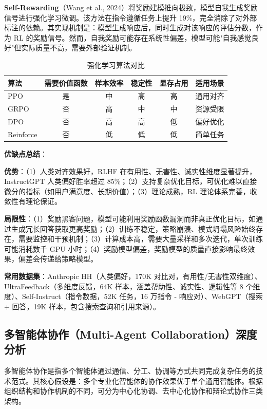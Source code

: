 \documentclass[12pt,a4paper]{article}
\begin{document}
\textbf{Self-Rewarding}（Wang et al., 2024）将奖励建模推向极致，模型自我生成奖励信号进行强化学习微调。该方法在指令遵循任务上提升 19\%，完全消除了对外部标注的依赖。其实现机制是：模型生成响应后，同时生成对该响应的评估分数，作为 RL 的奖励信号。然而，自我奖励可能存在系统性偏差，模型可能"自我感觉良好"但实际质量不高，需要外部验证机制。

\begin{table}[h]
\centering
\caption{强化学习算法对比}
\label{tab:rl-compare}
\begin{tabular}{@{}lccccc@{}}
\toprule
\textbf{算法} & \textbf{需要价值函数} & \textbf{样本效率} & \textbf{稳定性} & \textbf{显存占用} & \textbf{适用场景} \\
\midrule
PPO & 是 & 中 & 高 & 高 & 通用对齐 \\
GRPO & 否 & 高 & 中 & 中 & 资源受限 \\
DPO & 否 & 高 & 高 & 低 & 偏好优化 \\
Reinforce & 否 & 低 & 低 & 低 & 简单任务 \\
\bottomrule
\end{tabular}
\end{table}

\textbf{优缺点总结}：

\textbf{优势}：（1）人类对齐效果好，RLHF 在有用性、无害性、诚实性维度显著提升，InstructGPT 人类偏好胜率超过 85\%；（2）支持复杂优化目标，可优化难以直接微分的指标（如用户满意度、长期价值）；（3）理论成熟，RL 理论体系完善，收敛性有理论保证。

\textbf{局限性}：（1）奖励黑客问题，模型可能利用奖励函数漏洞而非真正优化目标，如通过生成冗长回答获取更高奖励；（2）训练不稳定，策略崩溃、模式坍塌风险始终存在，需要监控和干预机制；（3）计算成本高，需要大量采样和多次迭代，单次训练可能消耗数千 GPU 小时；（4）奖励模型偏差，奖励模型的质量直接影响最终效果，偏差会传递给策略模型。

\textbf{常用数据集}：Anthropic HH（人类偏好，170K 对比对，有用性/无害性双维度）、UltraFeedback（多维度反馈，64K 样本，涵盖帮助性、诚实性、逻辑性等 8 个维度）、Self-Instruct（指令数据，52K 任务，16 万指令 - 响应对）、WebGPT（搜索 + 回答，19K 样本，包含搜索查询和引用来源）。

\subsection{多智能体协作（Multi-Agent Collaboration）深度分析}

多智能体协作是指多个智能体通过通信、分工、协调等方式共同完成复杂任务的技术范式。其核心假设是：多个专业化智能体的协作效果优于单个通用智能体。根据组织结构和协作机制的不同，可分为中心化协调、去中心化协作和辩论式协作三类架构。
\end{document}
